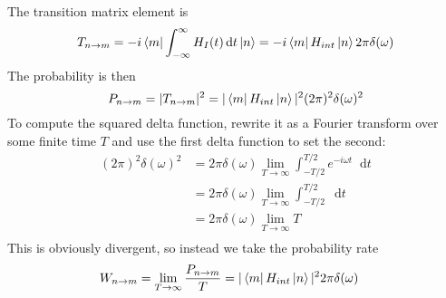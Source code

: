 \documentclass[12pt]{article}
\newcommand{\diff}{\mathop{}\!\mathrm{d}}
\theoremstyle{definition}
\begin{document}
The transition matrix element is
\begin{equation*}
    T_{n \to m}
        = -i \bra{m} \int_{-\infty}^\infty H_I(t) \diff t \ket{n} = -i \bra{m} H_{int} \ket{n} 2\pi\delta(\omega) 
\end{equation*}
The probability is then
\begin{equation*}
    P_{n \to m}
        = |T_{n \to m}|^2 = |\bra{m} H_{int} \ket{n}|^2 (2\pi)^2 \delta(\omega)^2
\end{equation*}
To compute the squared delta function, rewrite it as a Fourier transform over some finite time $T$ and use
the first delta function to set the second:
\begin{equation*}
\begin{split}
    (2\pi)^2 \delta(\omega)^2
        &= 2\pi\delta(\omega) \lim_{T \to \infty} \int_{-T/2}^{T/2} e^{-i\omega t} \diff t \\
        &= 2\pi\delta(\omega) \lim_{T \to \infty} \int_{-T/2}^{T/2} \diff t \\
        &= 2\pi\delta(\omega) \lim_{T \to \infty} T \\
\end{split}
\end{equation*}
This is obviously divergent, so instead we take the probability rate
\begin{equation*}
\begin{split}
    W_{n \to m}
        &= \lim_{T \to \infty} \frac{P_{n \to m}}{T} = |\bra{m} H_{int} \ket{n}|^2 2\pi\delta(\omega)
\end{split}
\end{equation*}
\end{document}

